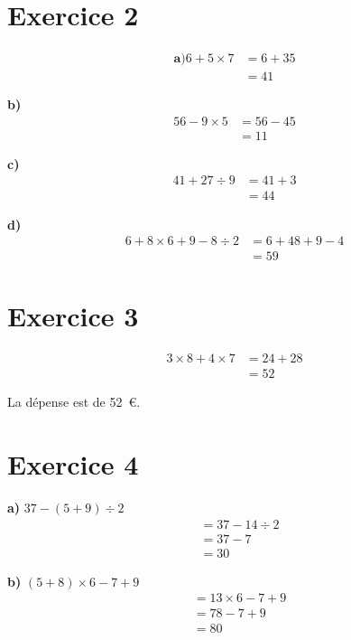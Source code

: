 \documentclass[12pt]{extarticle}
\begin{document}
\section*{Exercice 2}

\begin{align*}
\textbf{a)}
6 + 5 \times 7 &= 6 + 35 \\
               &= 41
\end{align*}

\textbf{b)}
\begin{align*}
56 - 9 \times 5 &= 56 - 45 \\
                &= 11
\end{align*}

\textbf{c)}
\begin{align*}
41 + 27 \div 9 &= 41 + 3 \\
               &= 44
\end{align*}

\textbf{d)}
\begin{align*}
6 + 8 \times 6 + 9 - 8 \div 2 &= 6 + 48 + 9 - 4 \\
                              &= 59
\end{align*}

\section*{Exercice 3}
\begin{align*}
3 \times 8 + 4 \times 7 &= 24 + 28 \\
                        &= 52
\end{align*}

La dépense est de 52~€.

\section*{Exercice 4}

\textbf{a)} $37 - (5 + 9) \div 2$
\begin{align*}
&= 37 - 14 \div 2 \\
&= 37 - 7 \\
&= 30
\end{align*}

\textbf{b)} $(5 + 8) \times 6 - 7 + 9$
\begin{align*}
&= 13 \times 6 - 7 + 9 \\
&= 78 - 7 + 9 \\
&= 80
\end{align*}
\end{document}
